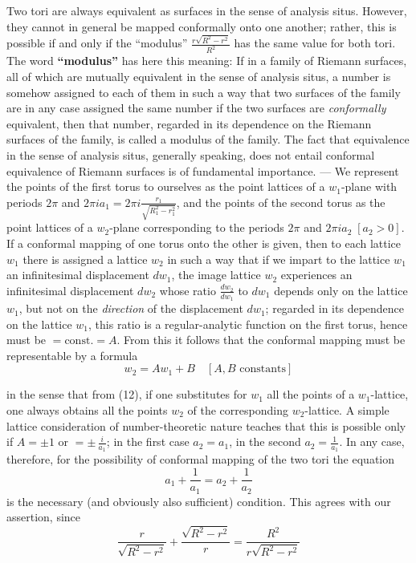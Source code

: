\documentclass{article}
\begin{document}
Two tori are always equivalent as surfaces in the sense of analysis situs. However, they cannot in general be mapped conformally onto one another; rather, this is possible if and only if the ``modulus'' $\frac{r\sqrt{R^2 - r^2}}{R^2}$ has the same value for both tori. The word \textbf{``modulus''} has here this meaning: If in a family of Riemann surfaces, all of which are mutually equivalent in the sense of analysis situs, a number is somehow assigned to each of them in such a way that two surfaces of the family are in any case assigned the same number if the two surfaces are \emph{conformally} equivalent, then that number, regarded in its dependence on the Riemann surfaces of the family, is called a modulus of the family. The fact that equivalence in the sense of analysis situs, generally speaking, does not entail conformal equivalence of Riemann surfaces is of fundamental importance. --- We represent the points of the first torus to ourselves as the point lattices of a $w_1$-plane with periods $2\pi$ and $2\pi i a_1 = 2\pi i \frac{r_1}{\sqrt{R_1^2 - r_1^2}}$, and the points of the second torus as the point lattices of a $w_2$-plane corresponding to the periods $2\pi$ and $2\pi i a_2\;[a_2 > 0]$. If a conformal mapping of one torus onto the other is given, then to each lattice $w_1$ there is assigned a lattice $w_2$ in such a way that if we impart to the lattice $w_1$ an infinitesimal displacement $dw_1$, the image lattice $w_2$ experiences an infinitesimal displacement $dw_2$ whose ratio $\frac{dw_2}{dw_1}$ to $dw_1$ depends only on the lattice $w_1$, but not on the \emph{direction} of the displacement $dw_1$; regarded in its dependence on the lattice $w_1$, this ratio is a regular-analytic function on the first torus, hence must be $=\mathrm{const.} = A$. From this it follows that the conformal mapping must be representable by a formula
\[ w_2 = A w_1 + B \quad [A, B \text{ constants}] \tag{12} \]

in the sense that from (12), if one substitutes for $w_1$ all the points of a $w_1$-lattice, one always obtains all the points $w_2$ of the corresponding $w_2$-lattice. A simple lattice consideration of number-theoretic nature teaches that this is possible only if $A = \pm 1$ or $= \pm\,\frac{i}{a_1}$; in the first case $a_2 = a_1$, in the second $a_2 = \frac{1}{a_1}$. In any case, therefore, for the possibility of conformal mapping of the two tori the equation
\[ a_1 + \frac{1}{a_1} = a_2 + \frac{1}{a_2} \]
is the necessary (and obviously also sufficient) condition. This agrees with our assertion, since
\[ \frac{r}{\sqrt{R^2 - r^2}} + \frac{\sqrt{R^2 - r^2}}{r} = \frac{R^2}{r\sqrt{R^2 - r^2}} \]
\end{document}
